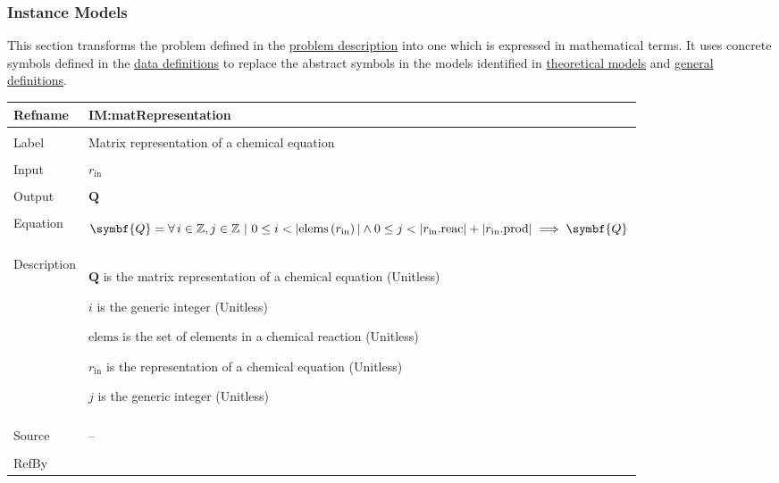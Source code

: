 \documentclass[12pt]{article}
\newcommand{\lt}{\ensuremath <}
\begin{document}
\subsubsection{Instance Models}
\label{Sec:IMs}
This section transforms the problem defined in the \hyperref[Sec:ProbDesc]{problem description} into one which is expressed in mathematical terms. It uses concrete symbols defined in the \hyperref[Sec:DDs]{data definitions} to replace the abstract symbols in the models identified in \hyperref[Sec:TMs]{theoretical models} and \hyperref[Sec:GDs]{general definitions}.

\vspace{\baselineskip}
\noindent
\begin{minipage}{\textwidth}
\begin{tabular}{>{\raggedright}p{}>{\raggedright\arraybackslash}p{}}
\toprule \textbf{Refname} & \textbf{IM:matRepresentation}
\label{IM:matRepresentation}
\\ \midrule \\
Label & Matrix representation of a chemical equation
        
\\ \midrule \\
Input & ${r_{\text{in}}}$
        
\\ \midrule \\
Output & $\symbf{Q}$
         
\\ \midrule \\
Equation & \begin{displaymath}
           \symbf{Q}=\forall{}\,i\in{}\mathbb{Z},j\in{}\mathbb{Z}\text{ | }0\leq{}i\lt{}|\text{elems}\left({r_{\text{in}}}\right)|\land{}0\leq{}j\lt{}|{r_{\text{in}}}\text{.reac}|+|{r_{\text{in}}}\text{.prod}|\implies{}\symbf{Q}
           \end{displaymath}
\\ \midrule \\
Description & \begin{symbDescription}
              \item{$\symbf{Q}$ is the matrix representation of a chemical equation (Unitless)}
              \item{$i$ is the generic integer (Unitless)}
              \item{$\text{elems}$ is the set of elements in a chemical reaction (Unitless)}
              \item{${r_{\text{in}}}$ is the representation of a chemical equation (Unitless)}
              \item{$j$ is the generic integer (Unitless)}
              \end{symbDescription}
\\ \midrule \\
Source & --
         
\\ \midrule \\
RefBy & 
\\ \bottomrule
\end{tabular}
\end{minipage}
\end{document}
